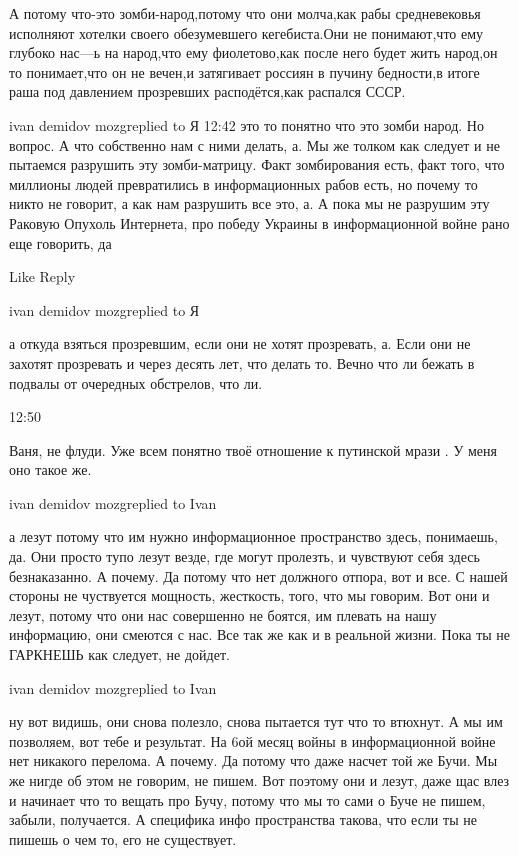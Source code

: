 А потому что-это зомби-народ,потому что они молча,как рабы средневековья
исполняют хотелки своего обезумевшего кегебиста.Они не понимают,что ему глубоко
нас---ь на народ,что ему фиолетово,как после него будет жить народ,он то
понимает,что он не вечен,и затягивает россиян в пучину бедности,в итоге раша
под давлением прозревших расподётся,как распался СССР.


ivan demidov mozgreplied to Я
12:42
это то понятно что это зомби народ. Но вопрос. А что собственно нам с ними делать, а. Мы же толком как следует и не пытаемся разрушить эту зомби-матрицу. Факт зомбирования есть, факт того, что миллионы людей превратились в информационных рабов есть, но почему то никто не говорит, а как нам разрушить все это, а. А пока мы не разрушим эту Раковую Опухоль Интернета, про победу Украины в информационной войне рано еще говорить, да

    Like
    Reply

ivan demidov mozgreplied to Я

а откуда взяться прозревшим, если они не хотят прозревать, а. Если они не
захотят прозревать и через десять лет, что делать то. Вечно что ли бежать в
подвалы от очередных обстрелов, что ли.

12:50

Ваня, не флуди. Уже всем понятно твоё отношение к путинской мрази . У меня оно
такое же.

ivan demidov mozgreplied to Ivan

а лезут потому что им нужно информационное пространство здесь, понимаешь, да.
Они просто тупо лезут везде, где могут пролезть, и чувствуют себя здесь
безнаказанно. А почему. Да потому что нет должного отпора, вот и все. С нашей
стороны не чуствуется мощность, жесткость, того, что мы говорим. Вот они и
лезут, потому что они нас совершенно не боятся, им плевать на нашу информацию,
они смеются с нас. Все так же как и в реальной жизни. Пока ты не ГАРКНЕШЬ как
следует, не дойдет.

ivan demidov mozgreplied to Ivan

ну вот видишь, они снова полезло, снова пытается тут что то втюхнут. А мы им
позволяем, вот тебе и результат. На 6ой месяц войны в информационной войне нет
никакого перелома. А почему. Да потому что даже насчет той же Бучи. Мы же нигде
об этом не говорим, не пишем. Вот поэтому они и лезут, даже щас влез и начинает
что то вещать про Бучу, потому что мы то сами о Буче не пишем, забыли,
получается. А специфика инфо пространства такова, что если ты не пишешь о чем
то, его не существует.

